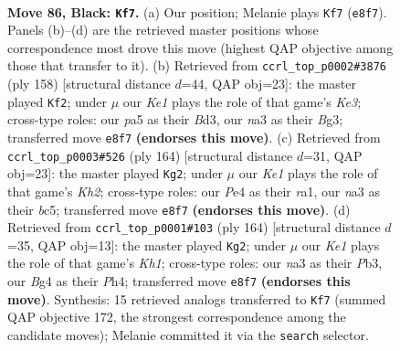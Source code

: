 \documentclass[11pt]{article}
\begin{document}
\clearpage

\begin{figure}[p]\centering
\begin{subfigure}{0.46\textwidth}\centering
\resizebox{\linewidth}{!}{%
\newchessgame
\chessboard[
  setfen={2n1k2K/2P5/p7/P4p1p/4pBb1/Nr4P1/8/R7 b - - 79 86},
  showmover=false,
  pgfstyle=straightmove, color=movearrow, markmove={e8-f7}
]}
\caption{}
\end{subfigure}\hfill
\begin{subfigure}{0.46\textwidth}\centering
\resizebox{\linewidth}{!}{%
\newchessgame
\chessboard[
  setfen={4k3/1b6/p5p1/P2P1pP1/1PP5/3BK1Br/8/8 w - - 3 80},
  showmover=false,
  pgfstyle=straightmove, color=movearrow, markmove={e3-f2}
]}
\caption{}
\end{subfigure}
\\[4pt]
\begin{subfigure}{0.46\textwidth}\centering
\resizebox{\linewidth}{!}{%
\newchessgame
\chessboard[
  setfen={8/7p/1p3k2/1BbR1p1P/P1P2P2/8/7K/r7 w - - 85 83},
  showmover=false,
  pgfstyle=straightmove, color=movearrow, markmove={h2-g2}
]}
\caption{}
\end{subfigure}\hfill
\begin{subfigure}{0.46\textwidth}\centering
\resizebox{\linewidth}{!}{%
\newchessgame
\chessboard[
  setfen={5k2/2b5/5p2/pR3B1p/P3P2P/1Pr5/8/7K w - - 1 83},
  showmover=false,
  pgfstyle=straightmove, color=movearrow, markmove={h1-g2}
]}
\caption{}
\end{subfigure}
\caption{\textbf{Move 86, Black: \texttt{Kf7}.} (a) Our position; Melanie plays \texttt{Kf7} (\texttt{e8f7}). Panels (b)--(d) are the retrieved master positions whose correspondence most drove this move (highest QAP objective among those that transfer to it). (b) Retrieved from \texttt{ccrl\_top\_p0002\#3876} (ply 158) [structural distance $d$=44, QAP obj=23]: the master played \texttt{Kf2}; under $\mu$ our \emph{Ke1} plays the role of that game's \emph{Ke3}; cross-type roles: our \emph{p}a5 as their \emph{B}d3, our \emph{n}a3 as their \emph{B}g3; transferred move \texttt{e8f7} \textbf{(endorses this move)}. (c) Retrieved from \texttt{ccrl\_top\_p0003\#526} (ply 164) [structural distance $d$=31, QAP obj=23]: the master played \texttt{Kg2}; under $\mu$ our \emph{Ke1} plays the role of that game's \emph{Kh2}; cross-type roles: our \emph{P}e4 as their \emph{r}a1, our \emph{n}a3 as their \emph{b}c5; transferred move \texttt{e8f7} \textbf{(endorses this move)}. (d) Retrieved from \texttt{ccrl\_top\_p0001\#103} (ply 164) [structural distance $d$=35, QAP obj=13]: the master played \texttt{Kg2}; under $\mu$ our \emph{Ke1} plays the role of that game's \emph{Kh1}; cross-type roles: our \emph{n}a3 as their \emph{P}b3, our \emph{B}g4 as their \emph{P}h4; transferred move \texttt{e8f7} \textbf{(endorses this move)}. Synthesis: 15 retrieved analogs transferred to \texttt{Kf7} (summed QAP objective 172, the strongest correspondence among the candidate moves); Melanie committed it via the \texttt{search} selector.}
\label{fig:thought-m171}
\end{figure}
\end{document}
